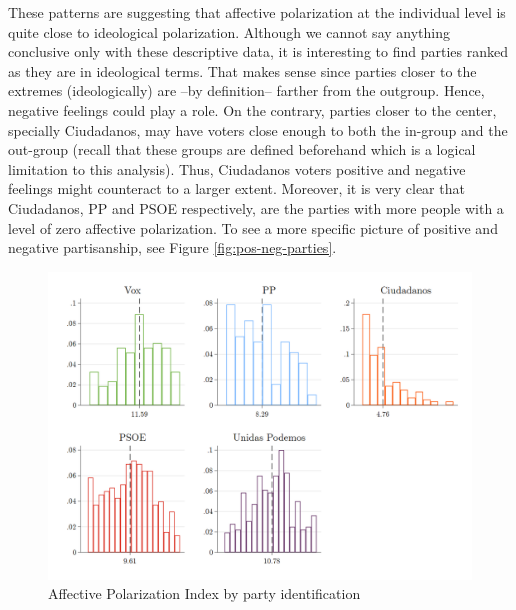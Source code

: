 \documentclass[a4paper, svgnames]{article}
\begin{document}
These patterns are suggesting that affective polarization at the individual level is quite close to ideological polarization. Although we cannot say anything conclusive only with these descriptive data, it is interesting to find parties ranked as they are in ideological terms. That makes sense since parties closer to the extremes (ideologically) are --by definition-- farther from the outgroup. Hence, negative feelings could play a role. On the contrary, parties closer to the center, specially Ciudadanos, may have voters close enough to both the in-group and the out-group (recall that these groups are defined beforehand which is a logical limitation to this analysis). Thus, Ciudadanos voters positive and negative feelings might counteract to a larger extent. Moreover, it is very clear that Ciudadanos, PP and PSOE respectively, are the parties with more people with a level of zero affective polarization. To see a more specific picture of positive and negative partisanship, see Figure \ref{fig:pos-neg-parties}.


\begin{figure}[H]
	\centering
	\includegraphics[width=\textwidth]{Figures/AP_index_by_party_id.png}
	\caption{\label{fig:AP_party_id} Affective Polarization Index by party identification}
\end{figure}
\end{document}
